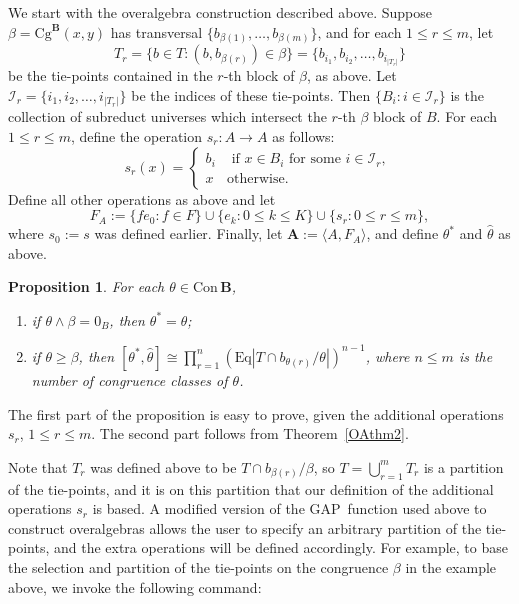 \documentclass[cm,dissertation,actual,final]{uhthesis}
\theoremstyle{plain}
\newtheorem{prop}[theorem]{Proposition}
\theoremstyle{definition}
\theoremstyle{remark}
\numberwithin{theorem}{section}
\numberwithin{claim}{chapter}
\numberwithin{equation}{section}
\numberwithin{conjecture}{chapter}
\newcommand{\<}{\ensuremath{\langle}}
\renewcommand{\>}{\ensuremath{\rangle}}
\renewcommand{\leq}{\ensuremath{\leqslant}}
\renewcommand{\geq}{\ensuremath{\geqslant}}
\newcommand{\meet}{\ensuremath{\wedge}}
\newcommand{\Eq}{\ensuremath{\mathrm{Eq}}}
\newcommand{\Cg}{\ensuremath{\mathrm{Cg}}}
\newcommand{\Con}{\ensuremath{\mathrm{Con\,}}}
\newcommand{\GAP}{\textsf{GAP}}
\newcommand{\0}{\ensuremath{\mathbf{0}}}
\newcommand{\1}{\ensuremath{\mathbf{1}}}
\newcommand{\2}{\ensuremath{\mathbf{2}}}
\newcommand{\3}{\ensuremath{\mathbf{3}}}
\newcommand{\4}{\ensuremath{\mathbf{4}}}
\newcommand{\5}{\ensuremath{\mathbf{5}}}
\newcommand{\bA}{\ensuremath{\mathbf{A}}}
\newcommand{\bB}{\ensuremath{\mathbf{B}}}
\newcommand{\sI}{\ensuremath{\mathscr{I}}}
\begin{document}
We start with the overalgebra construction described above.
Suppose $\beta = \Cg^\bB(x,y)$ has transversal 
$\{b_{\beta(1)}, \dots, b_{\beta(m)}\}$, and for each $1\leq r\leq m$, let 
\[
T_r = \{b\in T : (b, b_{\beta(r)}) \in \beta\} = 
\{b_{i_1}, b_{i_2}, \dots, b_{i_{|T_r|}}\}
\]
be the tie-points contained in the $r$-th block of $\beta$, as above. 
Let $\sI_r = \{i_1, i_2, \dots, i_{|T_r|}\}$ be the indices of these
tie-points.  Then $\{B_i : i \in \sI_r\}$ is the collection of subreduct
universes which intersect the $r$-th $\beta$ block of $B$.  
For each $1\leq r\leq m$, define the operation $s_r : A\rightarrow A$ as follows:
\[
s_r(x) =
\begin{cases}
  b_i & \text{ if $x \in B_i$ for some $i \in \sI_r$, }\\
  x & \text{otherwise}.
\end{cases}
\]
Define all other operations as above and let
\[
F_A := \{f e_0 : f\in F\} \cup \{e_k : 0\leq k \leq K\} \cup 
\{s_r : 0\leq r \leq m\},
\]
where $s_0 := s$ was defined earlier.  Finally, let 
$\bA:=\<A, F_A\>$, and define $\theta^*$ and $\widehat{\theta}$ as above.
\begin{prop}
  \label{prop:expansion}
  For each  $\theta \in \Con\bB$,
  \begin{enumerate}
  \item if $\theta \meet \beta = 0_B$, then $\theta^* = \widehat{\theta}$;
  \item if $\theta \geq \beta$, then $[\theta^*, \widehat{\theta}] \cong
    \prod_{r=1}^n (\Eq |T \cap b_{\theta(r)}/\theta|)^{n-1}$, where $n\leq m$  is
    the number of congruence classes of $\theta$.
  \end{enumerate}
\end{prop}
The first part of the proposition is easy to prove, given the additional
operations 
$s_r$, $1\leq r \leq m$.
The second part follows from Theorem~\ref{OAthm2}.

Note that $T_r$ was defined above to be $T \cap b_{\beta(r)}/\beta$, so $T =
\bigcup_{r=1}^m T_r$ is a partition of the tie-points, and it is on this partition
that our definition of the additional operations $s_r$ is based.  A modified version
of the \GAP\ function used above to construct overalgebras allows the user to specify an
arbitrary partition of the tie-points, and the extra operations will be
defined accordingly.  For example, to base the selection and partition of the
tie-points on the congruence $\beta$ in the example above, we invoke the
following command: 
\end{document}
